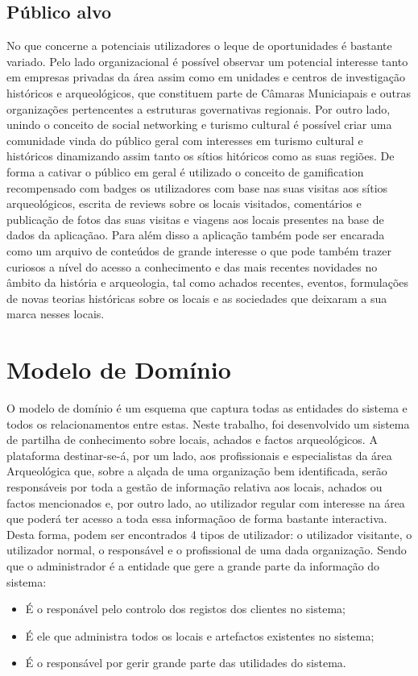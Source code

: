 ﻿\documentclass[12pt,a4paper]{article}
\begin{document}
\subsection{Público alvo}
No que concerne a potenciais utilizadores o leque de oportunidades é bastante variado.
Pelo lado organizacional é possível observar um potencial interesse tanto em empresas privadas
da área assim como em unidades e centros de investigação históricos e arqueológicos, que
constituem parte de Câmaras Municiapais e outras organizações pertencentes a estruturas
governativas regionais. Por outro lado, unindo o conceito de social networking e turismo
cultural é possível criar uma comunidade vinda do público geral com interesses em turismo
cultural e históricos dinamizando assim tanto os sítios hitóricos como as suas regiões. De
forma a cativar o público em geral é utilizado o conceito de gamification recompensado com
badges os utilizadores com base nas suas visitas aos sítios arqueológicos, escrita de reviews
sobre os locais visitados, comentários e publicação de fotos das suas visitas e viagens aos
locais presentes na base de dados da aplicaçãao. Para além disso a aplicação também pode
ser encarada como um arquivo de conteúdos de grande interesse o que pode também trazer
curiosos a nível do acesso a conhecimento e das mais recentes novidades no âmbito da história
e arqueologia, tal como achados recentes, eventos, formulações de novas teorias históricas
sobre os locais e as sociedades que deixaram a sua marca nesses locais.
\clearpage

\section{Modelo de Domínio}
O modelo de domínio é um esquema que captura todas as entidades do sistema e todos os relacionamentos entre estas. Neste trabalho, foi desenvolvido um sistema de partilha de conhecimento sobre locais, achados e factos arqueológicos. A plataforma destinar-se-á, por um lado, aos profissionais e especialistas da área Arqueológica que, sobre a alçada de uma organização bem identificada, serão responsáveis por toda a gestão de informação relativa aos locais, achados ou factos mencionados e, por outro lado, ao utilizador regular com interesse na área que poderá ter acesso a toda essa informaçãoo de forma bastante interactiva. Desta forma, podem ser encontrados 4 tipos de utilizador: o utilizador visitante, o utilizador normal, o responsável e o profissional de uma dada organização. Sendo que o administrador é a entidade que gere a grande parte da informação do sistema:\\
\begin{itemize}
\item É o responável pelo controlo dos registos dos clientes no sistema;
\item É ele que administra todos os locais e artefactos existentes no sistema;
\item É o responsável por gerir grande parte das utilidades do sistema.
\end{itemize}
\end{document}
